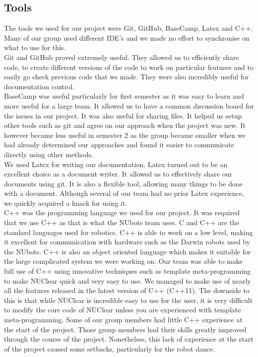 \documentclass[english,12pt]{scrartcl}
\begin{document}
	\subsection{Tools}
		The tools we used for our project were Git, GitHub, BaseCamp, Latex and C++.
		Many of our group used different IDE's and we made no effort to synchronise on what to use for this.
		\\
		Git and GitHub proved extremely useful.
		They allowed us to efficiently share code, to create different versions of the code to work on particular features and to easily go check previous code that we made. 
		They were also incredibly useful for documentation control.
		\\
		BaseCamp was useful particularly for first semester as it was easy to learn and more useful for a large team. 
		It allowed us to have a common discussion board for the issues in our project. It was also useful for sharing files.
		It helped us setup other tools such as git and agree on our approach when the project was new.
		It however became less useful in semester 2 as the group became smaller when we had already determined our approaches and found it easier to communicate directly using other methods.
		\\
		We used Latex for writing our documentation. 
		Latex turned out to be an excellent choice as a document writer. 
		It allowed us to effectively share our documents using git.
		It is also a flexible tool, allowing many things to be done with a document.
		Although several of our team had no prior Latex experience, we quickly acquired a knack for using it.
		\\
		C++ was the programming language we used for our project. 
		It was required that we use C++ as that is what the NUbots team uses. 
		C and C++ are the standard languages used for robotics. 
		C++ is able to work on a low level, making it excellent for communication with hardware such as the Darwin robots used by the NUbots.
		C++ is also an object oriented language which makes it suitable for the large complicated system we were working on.
		Our team was able to make full use of C++ using innovative techniques such as template meta-programming to make NUClear quick and very easy to use.
		We managed to make use of nearly all the features released in the latest version of C++ (C++11).
		The downside to this is that while NUClear is incredible easy to use for the user, it is very difficult to modify the core code of NUClear unless you are experienced with template meta-programming.
		Some of our group members had little C++ experience at the start of the project.
		Those group members had their skills greatly improved through the course of the project.
		Nonetheless, this lack of experience at the start of the project caused some setbacks, particularly for the robot dance.
		
\end{document}
